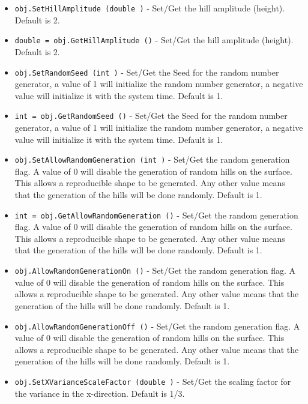 \begin{itemize}
\item  \verb|obj.SetHillAmplitude (double )| -  Set/Get the hill amplitude (height).
 Default is 2.

\item  \verb|double = obj.GetHillAmplitude ()| -  Set/Get the hill amplitude (height).
 Default is 2.

\item  \verb|obj.SetRandomSeed (int )| -  Set/Get the Seed for the random number generator, 
 a value of 1 will initialize the random number generator, 
 a negative value will initialize it with the system time.
 Default is 1.

\item  \verb|int = obj.GetRandomSeed ()| -  Set/Get the Seed for the random number generator, 
 a value of 1 will initialize the random number generator, 
 a negative value will initialize it with the system time.
 Default is 1.

\item  \verb|obj.SetAllowRandomGeneration (int )| -  Set/Get the random generation flag. 
 A value of 0 will disable the generation of random hills on the surface. 
 This allows a reproducible shape to be generated.
 Any other value means that the generation of the hills will be done
 randomly.
 Default is 1.

\item  \verb|int = obj.GetAllowRandomGeneration ()| -  Set/Get the random generation flag. 
 A value of 0 will disable the generation of random hills on the surface. 
 This allows a reproducible shape to be generated.
 Any other value means that the generation of the hills will be done
 randomly.
 Default is 1.

\item  \verb|obj.AllowRandomGenerationOn ()| -  Set/Get the random generation flag. 
 A value of 0 will disable the generation of random hills on the surface. 
 This allows a reproducible shape to be generated.
 Any other value means that the generation of the hills will be done
 randomly.
 Default is 1.

\item  \verb|obj.AllowRandomGenerationOff ()| -  Set/Get the random generation flag. 
 A value of 0 will disable the generation of random hills on the surface. 
 This allows a reproducible shape to be generated.
 Any other value means that the generation of the hills will be done
 randomly.
 Default is 1.

\item  \verb|obj.SetXVarianceScaleFactor (double )| -  Set/Get the scaling factor for the variance in the x-direction. 
 Default is 1/3.


\end{itemize}
